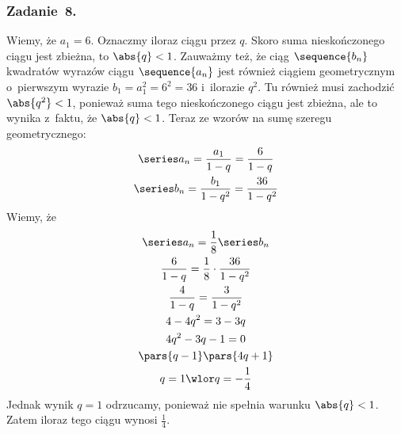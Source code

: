 \subsubsection*{Zadanie~8.}
Wiemy, że \(a_1 = 6\). Oznaczmy iloraz ciągu przez \(q\). Skoro suma nieskończonego ciągu jest zbieżna, to \(\abs{q} < 1\). Zauważmy też, że ciąg \(\sequence{b_n}\) kwadratów wyrazów ciągu \(\sequence{a_n}\) jest również ciągiem geometrycznym o~pierwszym wyrazie \(b_1 = a_1^2 = 6^2 = 36\) i~ilorazie \(q^2\). Tu również musi zachodzić \(\abs{q^2} < 1\), ponieważ suma tego nieskończonego ciągu jest zbieżna, ale to wynika z~faktu, że \(\abs{q} < 1\). Teraz ze wzorów na sumę szeregu geometrycznego:
\begin{gather*}
    \series a_n = \frac{a_1}{1 - q} = \frac{6}{1 - q}\\
    \series b_n = \frac{b_1}{1 - q^2} = \frac{36}{1 - q^2}
\end{gather*}
Wiemy, że
\begin{gather*}
    \series a_n = \frac{1}{8}\series b_n\\
    \frac{6}{1 - q} = \frac{1}{8} \cdot \frac{36}{1 - q^2}\\
    \frac{4}{1 - q} = \frac{3}{1 - q^2}\\
    4 - 4q^2 = 3 - 3q\\
    4q^2 - 3q - 1 = 0\\
    \pars{q - 1}\pars{4q + 1}\\
    q = 1 \wlor q = -\frac{1}{4}
\end{gather*}
Jednak wynik \(q = 1\) odrzucamy, ponieważ nie spełnia warunku \(\abs{q} < 1\). Zatem iloraz tego ciągu wynosi \(\frac{1}{4}\).
